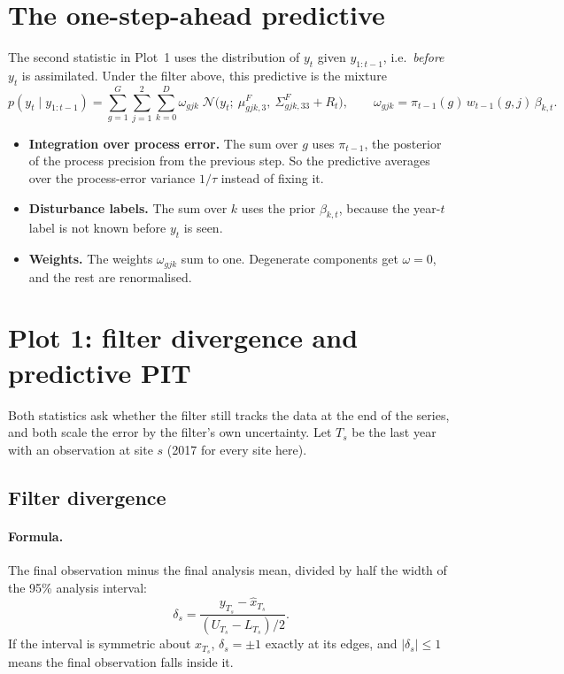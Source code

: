 \documentclass[11pt]{article}
\newcommand{\Norm}{\mathcal{N}}
\begin{document}
\section{The one-step-ahead predictive}
\label{sec:pred}

The second statistic in Plot~1 uses the distribution of $y_t$ given $y_{1:t-1}$, i.e.\
\emph{before} $y_t$ is assimilated. Under the filter above, this predictive is the mixture
\begin{equation}
  p(y_t \mid y_{1:t-1}) = \sum_{g=1}^{G}\sum_{j=1}^{2}\sum_{k=0}^{D}
    \omega_{gjk}\;\Norm\!\big(y_t;\ \mu^F_{gjk,3},\ \Sigma^F_{gjk,33} + R_t\big),
  \qquad
  \omega_{gjk} = \pi_{t-1}(g)\, w_{t-1}(g,j)\, \beta_{k,t}.
  \label{eq:pred}
\end{equation}
\begin{itemize}
  \item \textbf{Integration over process error.} The sum over $g$ uses $\pi_{t-1}$, the
  posterior of the process precision from the previous step. So the predictive averages
  over the process-error variance $1/\tau$ instead of fixing it.
  \item \textbf{Disturbance labels.} The sum over $k$ uses the prior $\beta_{k,t}$, because
  the year-$t$ label is not known before $y_t$ is seen.
  \item \textbf{Weights.} The weights $\omega_{gjk}$ sum to one. Degenerate components get
  $\omega = 0$, and the rest are renormalised.
\end{itemize}

\section{Plot 1: filter divergence and predictive PIT}
\label{sec:div}

Both statistics ask whether the filter still tracks the data at the end of the series,
and both scale the error by the filter's own uncertainty. Let $T_s$ be the last year with
an observation at site $s$ (2017 for every site here).

\subsection{Filter divergence}

\paragraph{Formula.} The final observation minus the final analysis mean, divided by half
the width of the 95\% analysis interval:
\[
  \delta_s = \frac{y_{T_s} - \hat x_{T_s}}{(U_{T_s} - L_{T_s})/2}.
\]
If the interval is symmetric about $\hat x_{T_s}$, $\delta_s = \pm1$ exactly at its
edges, and $|\delta_s| \le 1$ means the final observation falls inside it.
\end{document}
